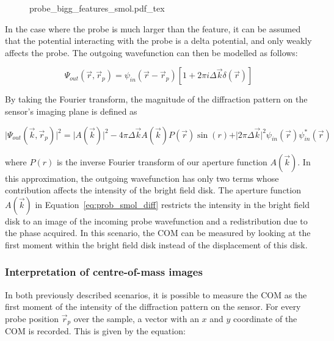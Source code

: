 \begin{figure}[h]
	\centering
	\def\svgwidth{1\linewidth}
    {probe_bigg_features_smol.pdf_tex}
	\caption{}
	\label{fig:big_boii_probe}
\end{figure}
In the case where the probe is much larger than the feature, it can be assumed that the potential interacting with the probe is a delta potential, and only weakly affects the probe. The outgoing wavefunction can then be modelled as follows: 

\begin{equation}
    \Psi_{out}(\vec{r},\vec{r}_p)=\psi_{in}(\vec{r}-\vec{r}_p)\left[ 1+2\pi i \Delta \vec{k}\delta(\vec{r})\right]
    \label{eq:prob_smol_out}
\end{equation}

By taking the Fourier transform, the magnitude of the diffraction pattern on the sensor's imaging plane is defined as 

\begin{equation}
    \vert \Psi_{out}(\vec{k},\vec{r}_p)\vert^2 = \vert A(\vec{k})\vert^2-4\pi \Delta \vec{k} A(\vec{k})P(\vec{r})\sin(r) + \vert 2\pi\Delta \vec{k}\vert^2 \psi_{in}(\vec{r})\psi^*_{in}(\vec{r})
    \label{eq:prob_smol_diff}
\end{equation}

where $P(r)$ is the inverse Fourier transform of our aperture function $A(\vec{k})$.
%
In this approximation, the outgoing wavefunction has only two terms whose contribution affects the intensity of the bright field disk. The aperture function $A(\vec{k})$ in Equation~\ref{eq:prob_smol_diff} restricts the intensity in the bright field disk to an image of the incoming probe wavefunction and a redistribution due to the phase acquired. 
%
In this scenario, the COM can be measured by looking at the first moment within the bright field disk instead of the displacement of this disk. 

\subsubsection{Interpretation of centre-of-mass images}
%
In both previously described scenarios, it is possible to measure the COM as the first moment of the intensity of the diffraction pattern on the sensor. For every probe position $\vec{r}_p$ over the sample, a vector with an $x$ and $y$ coordinate of the COM is recorded. This is given by the equation:

